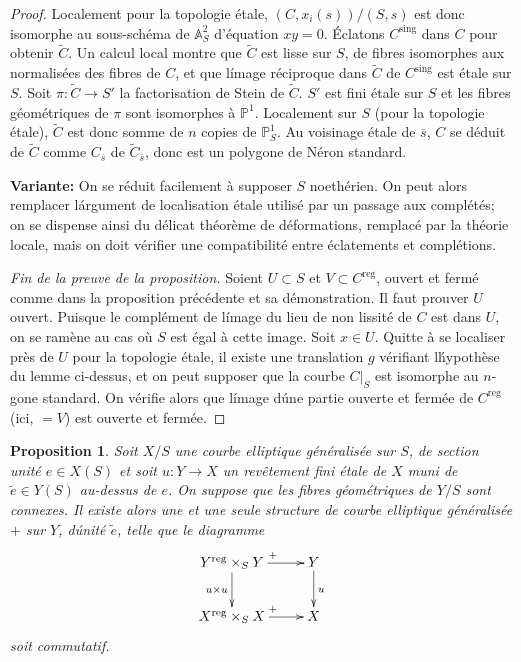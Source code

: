 \documentclass{amsart}
\theoremstyle{plain}
\newtheorem{proposition}[theorem]{Proposition}
\theoremstyle{remark}
\newcommand{\bbA}{\mathbb{A}}
\newcommand{\bbP}{\mathbb{P}}
\begin{document}
\begin{proof}
Localement pour la topologie \'etale, $(C, x_i(s))/(S,s)$ est donc isomorphe au
sous-sch\'ema de $\bbA^2_S$ d'\'equation $xy = 0$. \'Eclatons $C^{\mathrm{sing}}$ dans $C$ pour
obtenir $\widetilde{C}$. Un calcul local montre que $\widetilde{C}$ est lisse sur $S$, de
fibres isomorphes aux normalis\'ees des fibres de $C$, et que l\'image r\'eciproque
dans $\widetilde{C}$ de $C^{\mathrm{sing}}$ est \'etale sur $S$. Soit $\pi: \widetilde{C} \to S'$ la
factorisation de Stein de $\widetilde{C}$. $S'$ est fini \'etale sur $S$ et les fibres
g\'eom\'etriques de $\pi$ sont isomorphes \`a $\bbP^1$. Localement sur $S$ (pour la
topologie \'etale), $\widetilde{C}$ est donc somme de $n$ copies de $\bbP^1_S$. Au
voisinage \'etale de $\overline{s}$, $C$ se d\'eduit de $\widetilde{C}$ comme $C_{\overline{s}}$
de $\widetilde{C}_{\overline{s}}$, donc est un polygone de N\'eron standard.

\textbf{Variante:} On se r\'eduit facilement \`a supposer $S$ noeth\'erien. On peut alors
remplacer l\'argument de localisation \'etale utilis\'e par un passage aux
compl\'et\'es; on se dispense ainsi du d\'elicat th\'eor\`eme de d\'eformations, remplac\'e
par la th\'eorie locale, mais on doit v\'erifier une compatibilit\'e entre \'eclatements
et compl\'etions.

\textit{Fin de la preuve de la proposition.} Soient $U \subset S$ et
$V \subset C^{\mathrm{reg}}$, ouvert et ferm\'e comme dans la proposition pr\'ec\'edente et sa
d\'emonstration. Il faut prouver $U$ ouvert. Puisque le compl\'ement de l\'image du lieu
de non lissit\'e de $C$ est dans $U$, on se ram\`ene au cas o\`u $S$ est \'egal \`a cette
image. Soit $x \in U$. Quitte \`a se localiser pr\`es de $U$ pour la topologie \'etale,
il existe une translation $g$ v\'erifiant l\'hypoth\`ese du lemme ci-dessus, et on peut
supposer que la courbe $C|_S$ est isomorphe au $n$-gone standard. On v\'erifie alors
que l\'image d\'une partie ouverte et ferm\'ee de $C^{\mathrm{reg}}$ (ici, $= V$) est ouverte et
ferm\'ee.
\end{proof}

\begin{proposition}
Soit $X/S$ une courbe elliptique g\'en\'eralis\'ee sur $S$, de section unit\'e
$e \in X(S)$ et soit $u: Y \to X$ un rev\^etement fini \'etale de $X$ muni de
$\widetilde{e} \in Y(S)$ au-dessus de $e$. On suppose que les fibres g\'eom\'etriques de
$Y/S$ sont connexes. Il existe alors une et une seule structure de courbe elliptique
g\'en\'eralis\'ee $+$ sur $Y$, d\'unit\'e $\widetilde{e}$, telle que le diagramme
\begin{equation}
\xymatrix{
Y^{\mathrm{reg}} \times_S Y \ar[r]^{+} \ar[d]_{u \times u} & Y \ar[d]^{u} \\
X^{\mathrm{reg}} \times_S X \ar[r]^{+} & X}
\end{equation}
soit commutatif.
\end{proposition}
\end{document}
